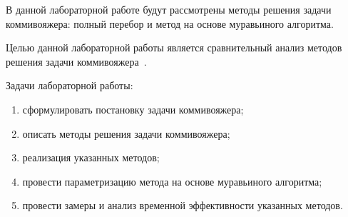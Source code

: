 
В данной лабораторной работе будут рассмотрены методы решения задачи коммивояжера: полный перебор и метод на основе муравьиного алгоритма. 

Целью данной лабораторной работы является сравнительный анализ методов решения задачи коммивояжера~\cite{Kjelldahl2008RealTimeLS}.

Задачи лабораторной работы:
\begin{enumerate}[label={\arabic*)}]
	\item сформулировать постановку задачи коммивояжера;
	\item описать методы решения задачи коммивояжера;
	\item реализация указанных методов;
	\item провести параметризацию метода на основе муравьиного алгоритма;
	\item провести замеры и анализ временной эффективности указанных методов.
\end{enumerate}
\clearpage	